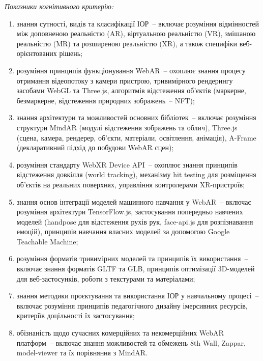 \textit{Показники когнітивного критерію:}
\begin{enumerate}
\item знання сутності, видів та класифікації ІОР~-- включає розуміння відмінностей між доповненою реальністю (AR), віртуальною реальністю (VR), змішаною реальністю (MR) та розширеною реальністю (XR), а також специфіки веб-орієнтованих рішень;
\item розуміння принципів функціонування WebAR~-- охоплює знання процесу отримання відеопотоку з камери пристрою, тривимірного рендерингу засобами WebGL та Three.js, алгоритмів відстеження об'єктів (маркерне, безмаркерне, відстеження природних зображень~-- NFT);
\item знання архітектури та можливостей основних бібліотек~-- включає розуміння структури MindAR (модулі відстеження зображень та облич), Three.js (сцена, камера, рендерер, об'єкти, матеріали, освітлення, анімація), A-Frame (декларативний підхід до побудови WebAR сцен);
\item розуміння стандарту WebXR Device API~-- охоплює знання принципів відстеження довкілля (world tracking), механізму hit testing для розміщення об'єктів на реальних поверхнях, управління контролерами XR-пристроїв;
\item знання основ інтеграції моделей машинного навчання у WebAR~-- включає розуміння архітектури TensorFlow.js, застосування попередньо навчених моделей (handpose для відстеження рухів рук, face-api.js для розпізнавання емоцій), принципів навчання власних моделей за допомогою Google Teachable Machine;
\item розуміння форматів тривимірних моделей та принципів їх використання~-- включає знання форматів GLTF та GLB, принципів оптимізації 3D-моделей для веб-застосунків, роботи з текстурами та матеріалами;
\item знання методики проєктування та використання ІОР у навчальному процесі~-- включає розуміння принципів педагогічного дизайну імерсивних ресурсів, критеріїв доцільності їх застосування;
\item обізнаність щодо сучасних комерційних та некомерційних WebAR платформ~-- включає знання можливостей та обмежень 8th Wall, Zappar, model-viewer та їх порівняння з MindAR.
\end{enumerate}

